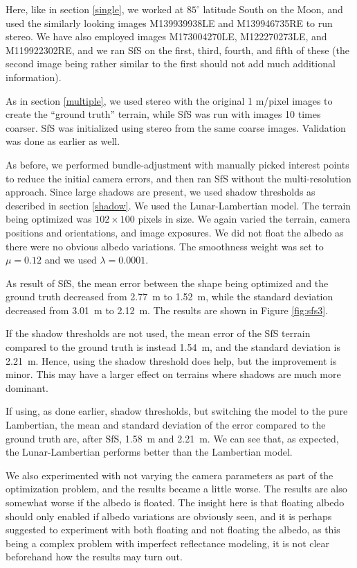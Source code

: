 \documentclass[12pt,oneside]{article}
\begin{document}
Here, like in section \ref{single}, we worked at $85^\circ$ latitude South
on the Moon, and used the similarly looking images
M139939938LE and M139946735RE to run stereo. We have also employed images M173004270LE, M122270273LE, and M119922302RE, and we ran SfS on the first, third, fourth, and fifth 
of these (the second image being rather similar to the first should not add much additional information).

As in section \ref{multiple}, we used  stereo with the original 1 m/pixel
images to create the ``ground truth'' terrain, while SfS was run
with images 10 times coarser. SfS was initialized using stereo from the same coarse images. Validation was done as earlier as well.

As before, we performed bundle-adjustment with manually picked interest points to reduce the initial camera errors, and then ran SfS without the
multi-resolution approach. Since large shadows are present, we used
shadow thresholds as described in section \ref{shadow}. We used the Lunar-Lambertian model. The terrain
being optimized was $102 \times 100$ pixels in size. We again varied the terrain, camera positions
and orientations, and image exposures. We did not float the albedo as there were no obvious albedo variations. The smoothness weight was set to $\mu=0.12$ and we used $\lambda=0.0001.$

As result of SfS, the mean error between the shape being optimized and
the ground truth decreased from 2.77~m to 1.52~m, while the standard
deviation decreased from 3.01~m to 2.12~m. 
The results are shown in Figure \ref{fig:sfs3}.

If the shadow thresholds are not
used, the mean error of the SfS terrain compared to the ground truth
is instead 1.54~m, and the standard deviation is 2.21~m. Hence, using
the shadow threshold does help, but the improvement is minor. This may have 
a larger effect on terrains where shadows are much more dominant. 

If using, as done earlier, shadow thresholds, but switching the model to the pure Lambertian, 
the mean and standard deviation of the error compared to the ground truth are, after SfS,
1.58~m and 2.21~m. We can see that, as expected, the Lunar-Lambertian performs
better than the Lambertian model. 

We also experimented with not varying the camera parameters as part of the optimization problem, and the results became a little worse.
The results are also somewhat worse if the albedo is floated. The insight here is that floating albedo should
only enabled if albedo variations are obviously seen, and it is perhaps suggested to experiment with both floating and not floating
the albedo, as this being a complex problem with imperfect reflectance modeling, it is not clear beforehand how the results may turn out.
\end{document}

